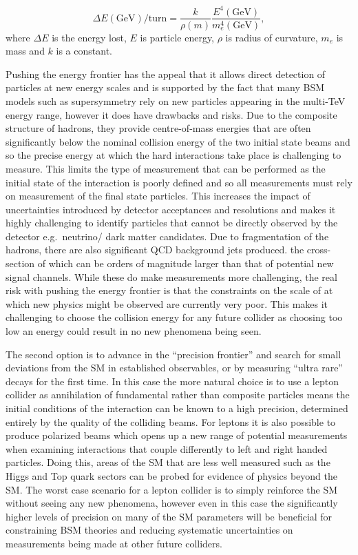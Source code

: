 \begin{equation}
\label{Eq:synchotron radiation}
\Delta E(\text{GeV})/\text{turn} = \frac{k}{\rho(m)}\frac{E^4(\text{GeV})}{m^4_e(\text{GeV})},
\end{equation}
where $\Delta E$ is the energy lost, $E$ is particle energy, $\rho$ is radius of curvature, $m_e$ is mass and $k$ is a constant.

Pushing the energy frontier has the appeal that it allows direct detection of particles at new energy scales and is supported by the fact that many \ac{BSM} models such as supersymmetry\cite{Baer:2012cf} rely on new particles appearing in the multi-TeV energy range, however it does have drawbacks and risks. Due to the composite structure of hadrons, they provide centre-of-mass energies that are often significantly below the nominal collision energy of the two initial state beams and so the precise energy at which the hard interactions take place is challenging to measure. This limits the type of measurement that can be performed as the initial state of the interaction is poorly defined and so all measurements must rely on measurement of the final state particles. This increases the impact of uncertainties introduced by detector acceptances and resolutions and makes it highly challenging to identify particles that cannot be directly observed by the detector e.g.\ neutrino/ dark matter candidates. Due to fragmentation of the hadrons, there are also significant \ac{QCD} background jets produced. the cross-section of which can be orders of magnitude larger than that of potential new signal channels. While these do make measurements more challenging, the real risk with pushing the energy frontier is that the constraints on the scale of at which new physics might be observed are currently very poor\cite{Dawson:2013bba}. This makes it challenging to choose the collision energy for any future collider as choosing too low an energy could result in no new phenomena being seen.

The second option is to advance in the ``precision frontier'' and search for small deviations from the \ac{SM} in established observables, or by measuring ``ultra rare'' decays for the first time\cite{Fujii:2015jha}. In this case the more natural choice is to use a lepton collider as annihilation of fundamental rather than composite particles means the initial conditions of the interaction can be known to a high precision, determined entirely by the quality of the colliding beams. For leptons it is also possible to produce polarized beams which opens up a new range of potential measurements when examining interactions that couple differently to left and right handed particles. Doing this, areas of the \ac{SM} that are less well measured such as the Higgs and Top quark sectors can be probed for evidence of physics beyond the \ac{SM}. The worst case scenario for a lepton collider is to simply reinforce the \ac{SM} without seeing any new phenomena, however even in this case the significantly higher levels of precision on many of the \ac{SM} parameters will be beneficial for constraining \ac{BSM} theories and reducing systematic uncertainties on measurements being made at other future colliders.

